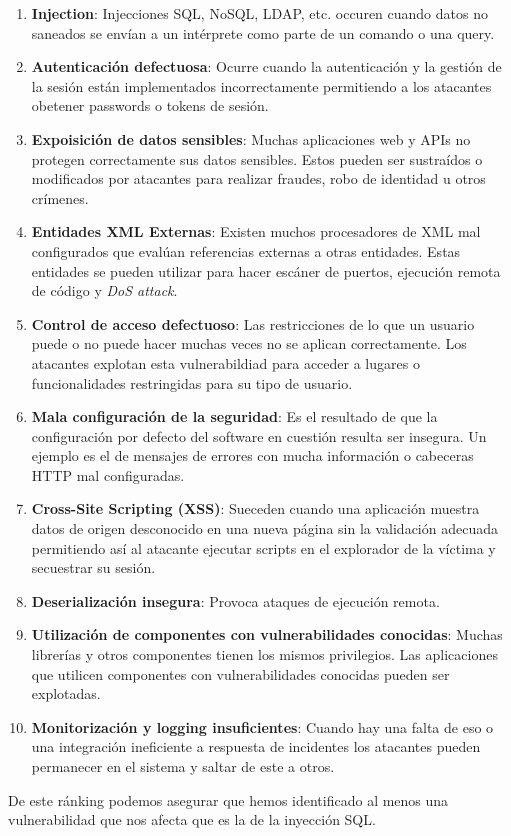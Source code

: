 \documentclass[a4paper,oneside]{article}
\begin{document}
\begin{itemize}
\begin{enumerate}
\item \textbf{Injection}: Injecciones SQL, NoSQL, LDAP, etc. occuren cuando datos no saneados se envían a un intérprete como parte de un comando o una query.
\item \textbf{Autenticación defectuosa}: Ocurre cuando la autenticación y la gestión de la sesión están implementados incorrectamente permitiendo a los atacantes obetener passwords o tokens de sesión.
\item \textbf{Expoisición de datos sensibles}: Muchas aplicaciones web y APIs no protegen correctamente sus datos sensibles. Estos pueden ser sustraídos o modificados por atacantes para realizar fraudes, robo de identidad u otros crímenes.
\item \textbf{Entidades XML Externas}: Existen muchos procesadores de XML mal configurados que evalúan referencias externas a otras entidades. Estas entidades se pueden utilizar para hacer escáner de puertos, ejecución remota de código y \textit{DoS attack}.
\item \textbf{Control de acceso defectuoso}: Las restricciones de lo que un usuario puede o no puede hacer muchas veces no se aplican correctamente. Los atacantes explotan esta vulnerabildiad para acceder a lugares o funcionalidades restringidas para su tipo de usuario.
\item \textbf{Mala configuración de la seguridad}: Es el resultado de que la configuración por defecto del software en cuestión resulta ser insegura. Un ejemplo es el de mensajes de errores con mucha información o cabeceras HTTP mal configuradas.
\item \textbf{Cross-Site Scripting (XSS)}: Sueceden cuando una aplicación muestra datos de origen desconocido en una nueva página sin la validación adecuada permitiendo así al atacante ejecutar scripts en el explorador de la víctima y secuestrar su sesión.
\item \textbf{Deserialización insegura}: Provoca ataques de ejecución remota.
\item \textbf{Utilización de componentes con vulnerabilidades conocidas}: Muchas librerías y otros componentes tienen los mismos privilegios. Las aplicaciones que utilicen componentes con vulnerabilidades conocidas pueden ser explotadas.
\item \textbf{Monitorización y logging insuficientes}: Cuando hay una falta de eso o una integración ineficiente a respuesta de incidentes los atacantes pueden permanecer en el sistema y saltar de este a otros.
\end{enumerate}
De este ránking podemos asegurar que hemos identificado al menos una vulnerabilidad que nos afecta que es la de la inyección SQL.

\end{itemize}
\end{document}
